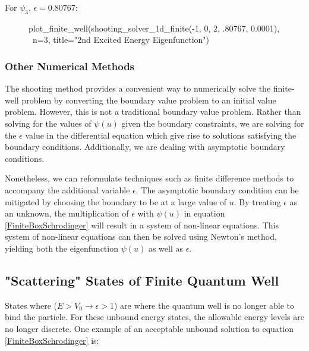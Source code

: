 \documentclass{article}
\begin{document}
For $\psi_3$, $\epsilon = 0.80767$:

\begin{figure}[H]
\begin{sageblock}
plot_finite_well(shooting_solver_1d_finite(-1, 0, 2, .80767, 0.0001), \
                      n=3, title="2nd Excited Energy Eigenfunction")
\end{sageblock}
\vspace{-.1in}
\centering
{}
\end{figure}

\subsubsection{Other Numerical Methods} 
The shooting method provides a convenient way to numerically solve the
finite-well problem by converting the boundary value problem to an initial
value problem. However, this is not a traditional boundary value problem.
Rather than solving for the values of $\psi(u)$ given the boundary constraints,
we are solving for the $\epsilon$ value in the differential equation which give
rise to solutions satisfying the boundary conditions. Additionally, we are dealing
with asymptotic boundary conditions.

Nonetheless, we can reformulate techniques such as finite difference methods to
accompany the additional variable $\epsilon$. The asymptotic boundary condition
can be mitigated by choosing the boundary to be at a large value of $u$. By
treating $\epsilon$ as an unknown, the multiplication of $\epsilon$ with
$\psi(u)$ in equation \eqref{FiniteBoxSchrodinger} will result in a system of
non-linear equations.  This system of non-linear equations can then be solved
using Newton's method, yielding both the eigenfunction $\psi(u)$ as well as
$\epsilon$. 

\subsection{"Scattering" States of Finite Quantum Well} 

States where ($E > V_0 \rightarrow \epsilon > 1$) are where the quantum well is
no longer able to bind the particle. For these unbound energy states, the
allowable energy levels are no longer discrete. One example of an acceptable
unbound solution to equation \eqref{FiniteBoxSchrodinger} is:
\end{document}
